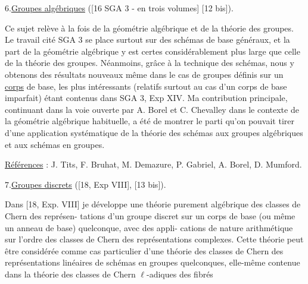 
6.\quad \uline{Groupes algébriques} ([16 SGA 3 - en trois volumes]
[12 bis]).

Ce sujet relève à la fois de la géométrie
algébrique et de la théorie des groupes. Le travail
cité SGA 3 se place surtout sur des schémas de base
généraux, et la part de la géométrie algébrique y est
certes considérablement plus large que celle de la
théorie des groupes. Néanmoins, grâce à la technique
des schémas, nous y obtenons des résultats nouveaux
même dans le cas de groupes définis sur un \uline{corps} de
base, les plus intéressants (relatifs surtout au cas
d'un corps de base imparfait) étant contenus dans
SGA 3, Exp XIV. Ma contribution principale, continuant
dans la voie ouverte par A. Borel et C. Chevalley dans
le contexte de la géométrie algébrique habituelle, a
été de montrer le parti qu'on pouvait tirer d'une
application systématique de la théorie des schémas aux
groupes algébriques et aux schémas en groupes.

\uline{Références} : J. Tits, F. Bruhat, M. Demazure, P. Gabriel,
A. Borel, D. Mumford.


7.\quad \uline{Groupes discrets} ([18, Exp VIII], [13 bis]).

Dans [18, Exp. VIII] je développe une théorie
purement algébrique des classes de Chern des représen-%
tations d'un groupe discret sur un corps de base
(ou même un anneau de base) quelconque, avec des appli-%
cations de nature arithmétique sur l'ordre des classes
de Chern des représentations complexes. Cette théorie
peut être considérée comme cas particulier d'une théorie
des classes de Chern des représentations linéaires
de schémas en groupes quelconques, elle-même contenue
dans la théorie des classes de Chern $\ell$-adiques des fibrés

